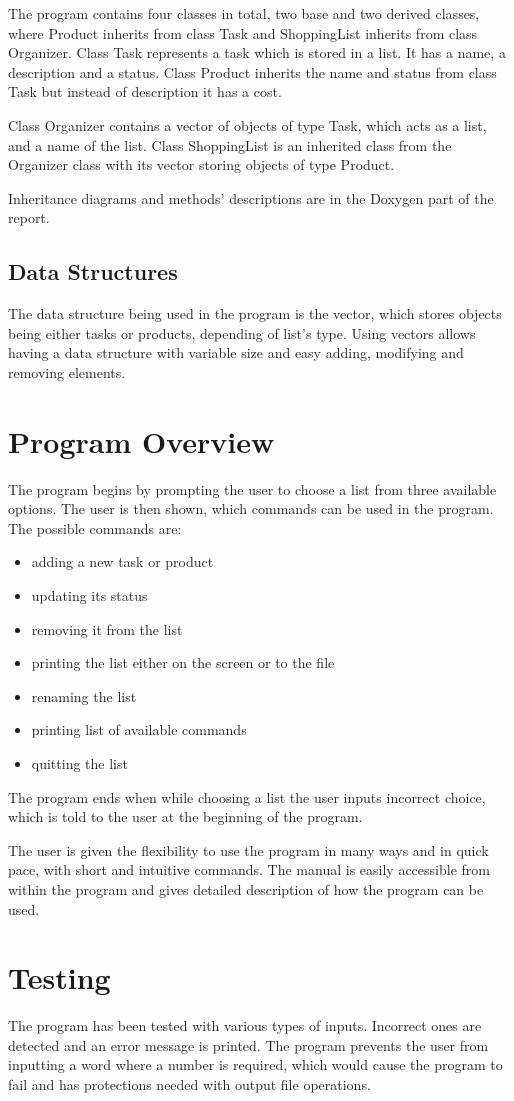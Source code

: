 \documentclass{article}
\begin{document}
The program contains four classes in total, two base and two derived classes, where Product inherits from class Task and ShoppingList inherits from class Organizer. 
Class Task represents a task which is stored in a list. It has a name, a description and a status. Class Product inherits the name and status from class Task but instead of description it has a cost.

Class Organizer contains a vector of objects of type Task, which acts as a list, and a name of the list. Class ShoppingList is an inherited class from the Organizer class with its vector storing objects of type Product.

Inheritance diagrams and methods' descriptions are in the Doxygen part of the report.

\subsection{Data Structures}

The data structure being used in the program is the vector, which stores objects being either tasks or products, depending of list's type. Using vectors allows having a data structure with variable size and easy adding, modifying and removing elements.  

\vfill

\section{Program Overview}

The program begins by prompting the user to choose a list from three available options. The user is then shown, which commands can be used in the program. The possible commands are:
\begin{itemize}
\item adding a new task or product
\item updating its status
\item removing it from the list
\item printing the list either on the screen or to the file
\item renaming the list
\item printing list of available commands
\item quitting the list
\end{itemize}
The program ends when while choosing a list the user inputs incorrect choice, which is told to the user at the beginning of the program.

The user is given the flexibility to use the program in many ways and in quick pace, with short and intuitive commands. The manual is easily accessible from within the program and gives detailed description of how the program can be used.

\section{Testing}

The program has been tested with various types of inputs. Incorrect ones are detected and an error message is printed. The program prevents the user from inputting a word where a number is required, which would cause the program to fail and has protections needed with output file operations.
\end{document}
